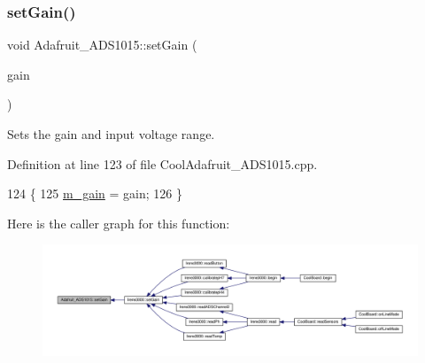 \mbox{\label{class_adafruit___a_d_s1015_a399441eace686975ff22937cbe45cc50}} 
\subsubsection{\texorpdfstring{set\+Gain()}{setGain()}}
{\footnotesize\ttfamily void Adafruit\+\_\+\+A\+D\+S1015\+::set\+Gain (\begin{DoxyParamCaption}\item[{\hyperlink{_cool_adafruit___a_d_s1015_8h_a3d6c0e15829a207b9155890811fa4781}{ads\+Gain\+\_\+t}}]{gain }\end{DoxyParamCaption})}



Sets the gain and input voltage range. 



Definition at line 123 of file Cool\+Adafruit\+\_\+\+A\+D\+S1015.\+cpp.


\begin{DoxyCode}
124 \{
125   \hyperlink{class_adafruit___a_d_s1015_a8db90fe03d55a18246984ba2ba5e7f32}{m\_gain} = gain;
126 \}
\end{DoxyCode}
Here is the caller graph for this function\+:\nopagebreak
\begin{figure}[H]
\begin{center}
\leavevmode
\includegraphics[width=350pt]{df/df6/class_adafruit___a_d_s1015_a399441eace686975ff22937cbe45cc50_icgraph}
\end{center}
\end{figure}
\mbox{\label{class_adafruit___a_d_s1015_aecd30775d943ea9d9cff0e3485926596}} 
